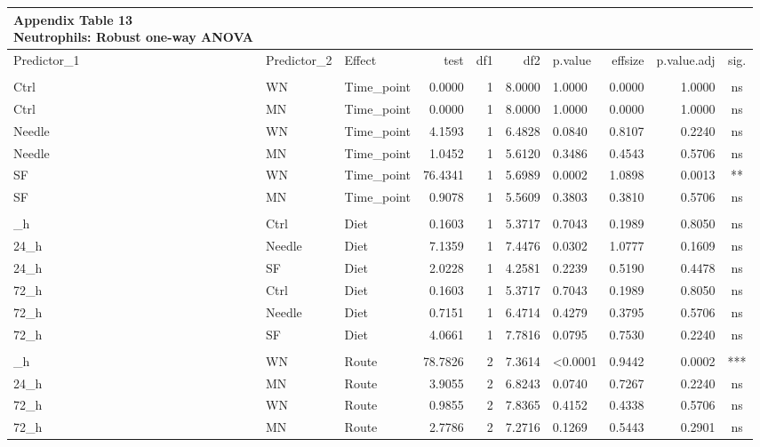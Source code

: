 \documentclass[
  12pt,
  letterpaper,
]{article}
\begin{document}
\begingroup
\fontsize{12.0pt}{14.4pt}\selectfont
\begin{longtable}{lllrrrlrrc}
\caption*{
{\large \textbf{Appendix Table 13}} \\ 
{\small \textbf{Neutrophils: Robust one-way ANOVA}}
} \\ 
\toprule
Predictor\_1 & Predictor\_2 & {Effect} & {test} & {df1} & {df2} & {p.value} & {effsize} & {p.value.adj} & {sig.} \\ 
\midrule\addlinespace[2.5pt]
\multicolumn{10}{l}{Predictor: Time\_point} \\[2.5pt] 
\midrule\addlinespace[2.5pt]
Ctrl & WN & Time\_point & 0.0000 & 1 & 8.0000 & 1.0000 & 0.0000 & 1.0000 & ns \\ 
Ctrl & MN & Time\_point & 0.0000 & 1 & 8.0000 & 1.0000 & 0.0000 & 1.0000 & ns \\ 
Needle & WN & Time\_point & 4.1593 & 1 & 6.4828 & 0.0840 & 0.8107 & 0.2240 & ns \\ 
Needle & MN & Time\_point & 1.0452 & 1 & 5.6120 & 0.3486 & 0.4543 & 0.5706 & ns \\ 
SF & WN & Time\_point & 76.4341 & 1 & 5.6989 & 0.0002 & 1.0898 & 0.0013 & ** \\ 
SF & MN & Time\_point & 0.9078 & 1 & 5.5609 & 0.3803 & 0.3810 & 0.5706 & ns \\ 
\midrule\addlinespace[2.5pt]
\multicolumn{10}{l}{Predictor: Diet} \\[2.5pt] 
\midrule\addlinespace[2.5pt]
24\_h & Ctrl & Diet & 0.1603 & 1 & 5.3717 & 0.7043 & 0.1989 & 0.8050 & ns \\ 
24\_h & Needle & Diet & 7.1359 & 1 & 7.4476 & 0.0302 & 1.0777 & 0.1609 & ns \\ 
24\_h & SF & Diet & 2.0228 & 1 & 4.2581 & 0.2239 & 0.5190 & 0.4478 & ns \\ 
72\_h & Ctrl & Diet & 0.1603 & 1 & 5.3717 & 0.7043 & 0.1989 & 0.8050 & ns \\ 
72\_h & Needle & Diet & 0.7151 & 1 & 6.4714 & 0.4279 & 0.3795 & 0.5706 & ns \\ 
72\_h & SF & Diet & 4.0661 & 1 & 7.7816 & 0.0795 & 0.7530 & 0.2240 & ns \\ 
\midrule\addlinespace[2.5pt]
\multicolumn{10}{l}{Predictor: Route} \\[2.5pt] 
\midrule\addlinespace[2.5pt]
24\_h & WN & Route & 78.7826 & 2 & 7.3614 & <0.0001 & 0.9442 & 0.0002 & *** \\ 
24\_h & MN & Route & 3.9055 & 2 & 6.8243 & 0.0740 & 0.7267 & 0.2240 & ns \\ 
72\_h & WN & Route & 0.9855 & 2 & 7.8365 & 0.4152 & 0.4338 & 0.5706 & ns \\ 
72\_h & MN & Route & 2.7786 & 2 & 7.2716 & 0.1269 & 0.5443 & 0.2901 & ns \\ 
\bottomrule
\end{longtable}
\endgroup
\end{document}
